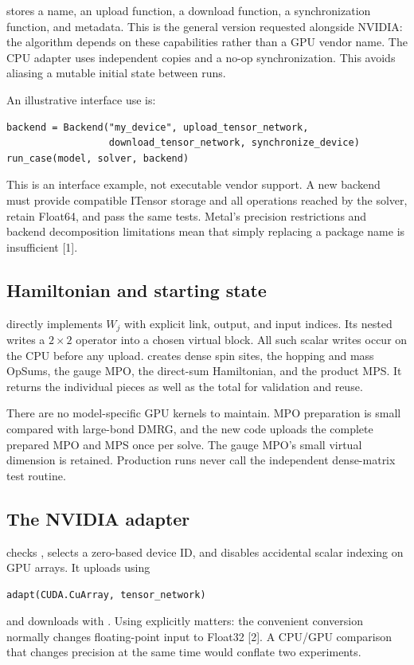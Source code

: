  stores a name, an upload function, a download function, a synchronization function, and metadata. This is the general version requested alongside NVIDIA: the algorithm depends on these capabilities rather than a GPU vendor name. The CPU adapter uses independent copies and a no-op synchronization. This avoids aliasing a mutable initial state between runs.

An illustrative interface use is:
\begin{lstlisting}
backend = Backend("my_device", upload_tensor_network,
                  download_tensor_network, synchronize_device)
run_case(model, solver, backend)
\end{lstlisting}
This is an interface example, not executable vendor support. A new backend must provide compatible ITensor storage and all operations reached by the solver, retain Float64, and pass the same tests. Metal's precision restrictions and backend decomposition limitations mean that simply replacing a package name is insufficient [1].

\subsection{Hamiltonian and starting state}
 directly implements $W_j$ with explicit link, output, and input indices. Its nested  writes a $2\times2$ operator into a chosen virtual block. All such scalar writes occur on the CPU before any upload.  creates dense spin sites, the hopping and mass OpSums, the gauge MPO, the direct-sum Hamiltonian, and the product MPS. It returns the individual pieces as well as the total for validation and reuse.

There are no model-specific GPU kernels to maintain. MPO preparation is small compared with large-bond DMRG, and the new code uploads the complete prepared MPO and MPS once per solve. The gauge MPO's small virtual dimension is retained. Production runs never call the independent dense-matrix test routine.

\subsection{The NVIDIA adapter}
 checks , selects a zero-based device ID, and disables accidental scalar indexing on GPU arrays. It uploads using
\begin{lstlisting}
adapt(CUDA.CuArray, tensor_network)
\end{lstlisting}
and downloads with . Using  explicitly matters: the convenient  conversion normally changes floating-point input to Float32 [2]. A CPU/GPU comparison that changes precision at the same time would conflate two experiments.

